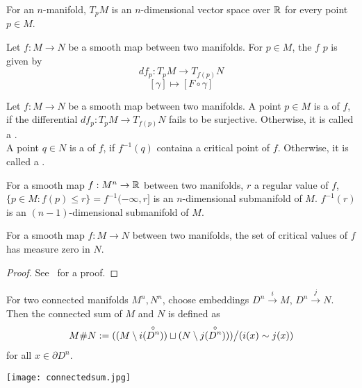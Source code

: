 \documentclass[a4paper,11pt]{article}
\begin{document}
\begin{remark}
    For an \(n\)-manifold, \(T_p M\) is an \(n\)-dimensional vector space over \(\mathbb{R}\) for every point \(p\in M\).
\end{remark}

\begin{definition}
    Let \(f:M\to N\) be a smooth map between two manifolds. For \(p\in M\), the  \(f\)  \(p\) is given by
    \[df_p:T_pM\to T_{f(p)}N\]
    \[[\gamma]\mapsto[F\circ \gamma]\]
\end{definition}

\begin{definition}
    Let \(f:M\to N\) be a smooth map between two manifolds. A point \(p\in M\) is a  of \(f\), if the differential \(df_p:T_p M\to T_{f(p)}N\) fails to be surjective. Otherwise, it is called a .\\
    A point \(q\in N\) is a  of \(f\), if \(f^{-1}(q)\) containa a critical point of \(f\). Otherwise, it is called a .
\end{definition}

\begin{remark}
    For a smooth map \(f:M^n\to \mathbb{R}\) between two manifolds, \(r\) a regular value of \(f\), \(\{p\in M:f(p)\leq r\}=f^{-1}(-\infty,r]\) is an \(n\)-dimensional submanifold of \(M\). \(f^{-1}(r)\) is an \((n-1)\)-dimensional submanifold of \(M\).
\end{remark}

\begin{theorem}\label{sard}
    For a smooth map \(f:M\to N\) between two manifolds, the set of critical values of \(f\) has measure zero in \(N\).
\end{theorem}

\begin{proof}
    See\ \cite{lee} for a proof.
\end{proof}

\begin{definition}
    For two connected manifolds \(M^n,N^n\), choose embeddings \(D^n\xrightarrow{i}M\), \(D^n\xrightarrow{j}N\). Then the connected sum of \(M\) and \(N\) is defined as
    \[M\#N:=((M\setminus i(\overset{\circ}{D^n}))\sqcup(N\setminus j(\overset{\circ}{D^n})))\big/(i(x)\sim j(x))\]
    for all \(x\in\partial D^n\).
    \begin{center}
        \texttt{[image: connectedsum.jpg]}
    \end{center}
\end{definition}
\end{document}

